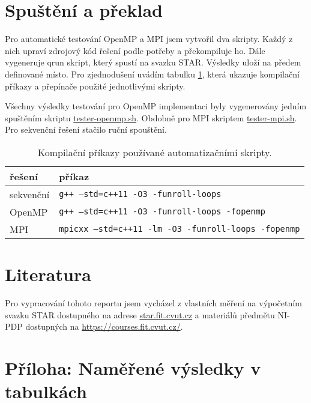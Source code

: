 \documentclass{article}
\newcommand{\const}[1]{\texttt{#1}}
\begin{document}
    \newpage
    \section{Spuštění a překlad}
    Pro automatické testování OpenMP a MPI jsem vytvořil dva skripty. Každý z nich upraví zdrojový kód řešení
    podle potřeby a překompiluje ho. Dále vygeneruje qrun skript, který spustí na svazku STAR. Výsledky uloží na
    předem definované místo. Pro zjednodušení uvádím tabulku \ref{tab:compilation-short}, která ukazuje kompilační příkazy a přepínače
    použité jednotlivými skripty.

    Všechny výsledky testování pro OpenMP implementaci byly vygenerovány jedním spuštěním skriptu
    \href{https://github.com/TaIos/ni-pdp-vysledky-mereni-star/blob/master/openmp/tester-openmp.sh}{tester-openmp.sh}.
    Obdobně pro MPI skriptem \href{https://github.com/TaIos/ni-pdp-vysledky-mereni-star/blob/master/mpi/tester-mpi.sh}{tester-mpi.sh}.
    Pro sekvenční řešení stačilo ruční spouštění.


    \begin{table}[ht]
        \centering
        \begin{tabular}{|l|l|}
            \hline
            \textbf{řešení}    & \textbf{příkaz}                                      \\ \hline
            sekvenční & \const{g++ --std=c++11 -O3 -funroll-loops}          \\ \hline
            OpenMP    & \const{g++ --std=c++11 -O3 -funroll-loops -fopenmp} \\ \hline
            MPI       & \const{mpicxx --std=c++11 -lm -O3 -funroll-loops -fopenmp}   \\ \hline
        \end{tabular}
        \caption{Kompilační příkazy používané automatizačními skripty.}
        \label{tab:compilation-short}
    \end{table}

\section{Literatura}
    Pro vypracování tohoto reportu jsem vycházel z vlastních měření na výpočetním svazku STAR dostupného na adrese \url{star.fit.cvut.cz} a
    materiálů předmětu NI-PDP dostupných na \url{https://courses.fit.cvut.cz/}.

    \section{Příloha: Naměřené výsledky v tabulkách}
\end{document}

